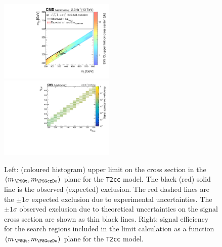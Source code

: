 \clearpage
\begin{figure}[!h]
  \begin{center}
    \includegraphics[width=0.49\textwidth]{RA1T2ccXSEC_aux} \, 
    \includegraphics[width=0.49\textwidth]{T2cc_merging_4_cats_aux} \,     
  \end{center}
  \caption{Left: (coloured histogram) upper limit on the cross section in the $(m_{\,\PSQt}, m_{\PSGczDo})$ plane for the \texttt{T2cc} model. 
  The black (red) solid line is the observed (expected) exclusion. The red dashed lines are the $\pm1\sigma$ expected exclusion due to experimental uncertainties. 
  The $\pm1\sigma$ observed exclusion due to theoretical uncertainties on the signal cross section are shown as thin black lines. 
  Right: signal efficiency for the search regions included in the limit calculation as a function $(m_{\,\PSQt}, m_{\PSGczDo})$ plane for the \texttt{T2cc} model. 
  \label{fig:T2cc_excl}}
\end{figure}


